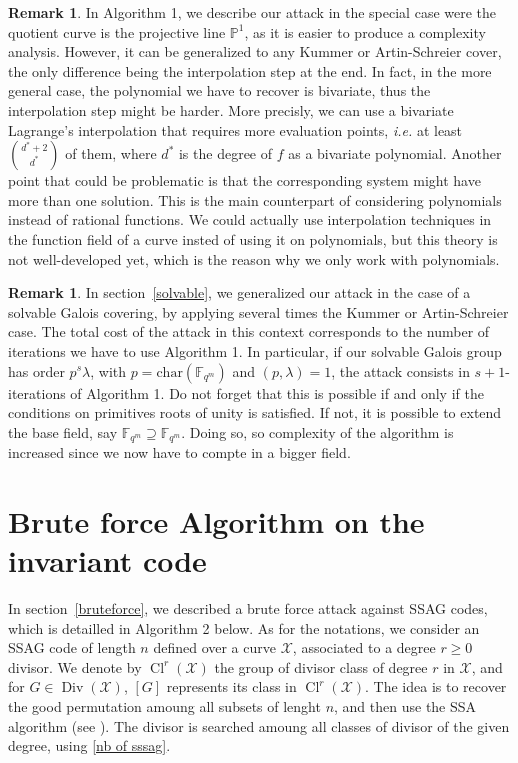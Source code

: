 \documentclass[10pt]{article}
\theoremstyle{definition}
\newtheorem{rq1}[thm]{Remark}
\theoremstyle{definition}
\theoremstyle{definition}
\newcommand{\PP}{\mathbb{P}}
\newcommand{\Fqm}{\mathbb{F}_{q^m}}
\newcommand{\X}{\mathcal{X}}
\newcommand{\Div}{\operatorname{Div}}
\newcommand{\Cl}{\operatorname{Cl}}
\begin{document}
\begin{rq1}
In Algorithm 1, we describe our attack in the special case were the quotient curve is the projective line $\PP^1$, as it is easier to produce a complexity analysis. However, it can be generalized to any Kummer or Artin-Schreier cover, the only difference being the interpolation step at the end. In fact, in the more general case, the polynomial we have to recover is bivariate, thus the interpolation step might be harder. More precisly, we can use a bivariate Lagrange's interpolation that requires more evaluation points, \textit{i.e.} at least $\binom{d^*+2}{d^*}$ of them, where $d^*$ is the degree of $f$ as a bivariate polynomial. Another point that could be problematic is that the corresponding system might have more than one solution.
This is the main counterpart of considering polynomials instead of rational functions. We could actually use interpolation techniques in the function field of a curve insted of using it on polynomials, but this theory is not well-developed yet, which is the reason why we only work with polynomials.
\end{rq1}

\begin{rq1}
In section~\ref{solvable}, we generalized our attack in the case of a solvable Galois covering, by applying several times the Kummer or Artin-Schreier case. The total cost of the attack in this context corresponds to the number of iterations we have to use Algorithm 1. In particular, if our solvable Galois group has order $p^s\lambda$, with $p=\mathrm{char}(\Fqm)$ and $(p,\lambda)=1$, the attack consists in $s+1$-iterations of Algorithm 1. Do not forget that this is possible if and only if the conditions on primitives roots of unity is satisfied. If not, it is possible to extend the base field, say $\mathbb{F}_{q^m} \supseteq \Fqm$. Doing so, so complexity of the algorithm is increased since we now have to compte in a bigger field.
\end{rq1}

\newpage

\section{Brute force Algorithm on the invariant code}


In section~\ref{bruteforce}, we described a brute force attack against SSAG codes, which is detailled in Algorithm 2 below. As for the notations, we consider an SSAG code of length $n$ defined over a curve $\X$, associated to a degree $r \geq 0$ divisor. We denote by $\Cl^r(\X)$ the group of divisor class of degree $r$ in $\X$, and for $G \in \Div(\X)$, $[G]$ represents its class in $\Cl^r(\X)$. The idea is to recover the good permutation amoung all subsets of lenght $n$, and then use the SSA algorithm (see \cite{SSA}). The divisor is searched amoung all classes of divisor of the given degree, using \eqref{nb of sssag}.
\end{document}
